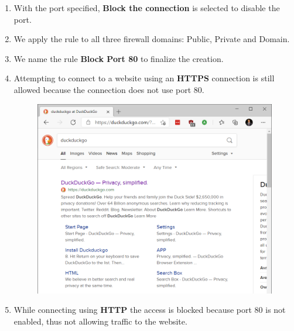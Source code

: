 \begin{enumerate}
\begin{figure}[H]
    \end{figure}
    \item With the port specified, \textbf{Block the connection} is selected to disable the port.
    \item We apply the rule to all three firewall domains: Public, Private and Domain.
    \item We name the rule \textbf{Block Port 80} to finalize the creation.
    \item Attempting to connect to a website using an \textbf{HTTPS} connection is still allowed because the connection does not use port 80.
    \begin{figure}[H]
        \includegraphics[width=\linewidth]{figures/pic11.png}
    \end{figure}
    \item While connecting using \textbf{HTTP} the access is blocked because port 80 is not enabled, thus not allowing traffic to the website.
    \begin{figure}[H]

\end{figure}
\end{enumerate}

